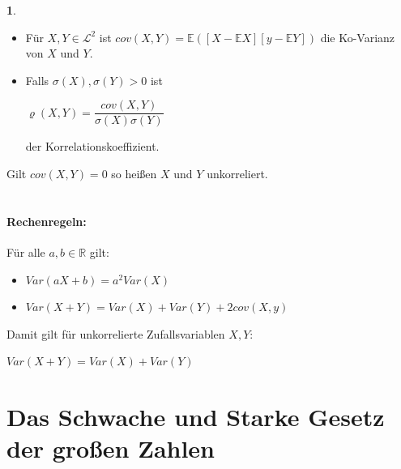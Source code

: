 \documentclass[10pt,a4paper]{report}
\numberwithin{equation}{section}
\numberwithin{figure}{section}
\theoremstyle{plain}
\theoremstyle{definition}
\newtheorem{defn}[thm]{\protect\definitionname}
\theoremstyle{remark}
\theoremstyle{plain}
\providecommand{\definitionname}{Definition}
\newcommand{\1}{ \mathbb{1} } %
\begin{document}
\begin{defn}   %
  \begin{itemize}
  \item Für $X,Y \in \mathcal{L}^2$ ist
    $cov(X,Y)=\mathbb{E}([X-\mathbb{E}X][y-\mathbb{E}Y])$ die
    Ko-Varianz von $X$ und $Y$.
  \item Falls $\sigma(X), \sigma(Y)>0$ ist
    \begin{center}
      $\varrho(X,Y)=\dfrac{cov(X,Y)}{\sigma(X)\sigma(Y)}$
    \end{center}
    der Korrelationskoeffizient.
  \end{itemize}
  Gilt $cov(X,Y)=0$ so heißen $X$ und $Y$ unkorreliert.\\\\
\end{defn}
\paragraph{Rechenregeln:}
Für alle $a,b \in \mathbb{R}$ gilt:
\begin{itemize}
\item $Var(aX+b)=a^2Var(X)$
\item $Var(X+Y)=Var(X)+Var(Y)+2cov(X,y)$
\end{itemize}
Damit gilt für unkorrelierte Zufallsvariablen $X,Y$:
\begin{center}
  $Var(X+Y)=Var(X)+Var(Y)$
\end{center} 
\section{Das Schwache und Starke Gesetz der großen Zahlen}
\label{sec:gesetz-grosser-zahlen}
\end{document}

